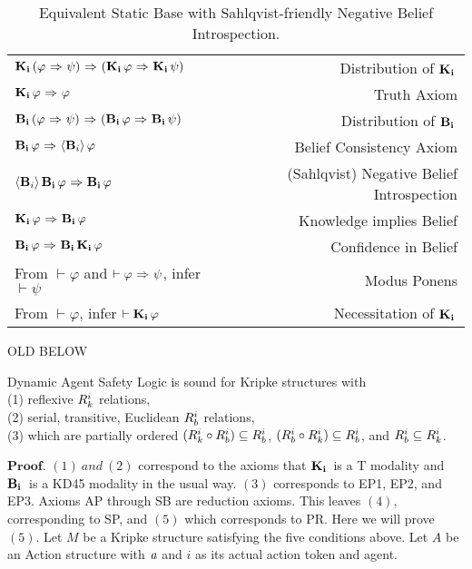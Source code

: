 \begin{table}[H]
	\begin{center}
		\begin{tabular}{| l r |}
			\hline
			$\mathbf{K}_{\mathbf{i}}\,(\varphi {\ \Rightarrow \ } \psi) {\ \Rightarrow \ } (\mathbf{K}_{\mathbf{i}}\,\varphi {\ \Rightarrow \ } \mathbf{K}_{\mathbf{i}}\,\psi)$ & Distribution of $\mathbf{K}_{\mathbf{i}}\,$ \\
			$\mathbf{K}_{\mathbf{i}}\,\varphi {\ \Rightarrow \ } \varphi$ & Truth Axiom \\
			$\mathbf{B}_{\mathbf{i}}\,(\varphi {\ \Rightarrow \ } \psi) {\ \Rightarrow \ } (\mathbf{B}_{\mathbf{i}}\,\varphi {\ \Rightarrow \ } \mathbf{B}_{\mathbf{i}}\,\psi)$ & Distribution of $\mathbf{B}_{\mathbf{i}}\,$\\
			$\mathbf{B}_{\mathbf{i}}\,\varphi {\ \Rightarrow \ } \langle \mathbf{B}_{i} \rangle\,\varphi$ & Belief Consistency Axiom\\
			$\langle \mathbf{B}_{i} \rangle\,\mathbf{B}_{\mathbf{i}}\,\varphi {\ \Rightarrow \ } \mathbf{B}_{\mathbf{i}}\,\varphi$ & (Sahlqvist) Negative Belief Introspection\\
			$\mathbf{K}_{\mathbf{i}}\,\varphi {\ \Rightarrow \ } \mathbf{B}_{\mathbf{i}}\,\varphi$ & Knowledge implies Belief \\
			$\mathbf{B}_{\mathbf{i}}\,\varphi {\ \Rightarrow \ } \mathbf{B}_{\mathbf{i}}\,\mathbf{K}_{\mathbf{i}}\,\varphi$ & Confidence in Belief\\
			From $\vdash \varphi$ and $\vdash \varphi {\ \Rightarrow \ } \psi$, infer $\vdash\psi$ & Modus Ponens\\
			From $\vdash \varphi$, infer $\vdash \mathbf{K}_{\mathbf{i}}\,\varphi$ & Necessitation of $\mathbf{K}_{\mathbf{i}}\,$\\
			\hline
		\end{tabular}
		\caption{Equivalent Static Base with Sahlqvist-friendly Negative Belief Introspection.}
	\end{center}
\end{table}




OLD BELOW

\begin{tcolorbox}
	\begin{theorem}[Soundness]
		Dynamic Agent Safety Logic is sound for Kripke structures with\\ (1) reflexive $R_{k}^i$ relations,\\ (2) serial, transitive, Euclidean $R_{b}^i$ relations, \\(3) which are partially ordered $(R_{k}^i \circ R_{b}^i) \subseteq R_{b}^i$, $(R_{b}^i \circ R_{k}^i) \subseteq R_{b}^i$, and $R_{b}^i \subseteq R_{k}^i$.
	\end{theorem}
\end{tcolorbox}
$\mathbf{Proof}.$ $(1)\  and\  (2)$ correspond to the axioms that $\mathbf{K}_{\mathbf{i}}\,$ is a T modality and $\mathbf{B}_{\mathbf{i}}\,$ is a KD45 modality in the usual way. $(3)$ corresponds to EP1, EP2, and EP3. Axioms AP through SB are reduction axioms. This leaves $(4)$, corresponding to SP, and $(5)$ which corresponds to PR. Here we will prove $(5)$. Let $M$ be a Kripke structure satisfying the five conditions above. Let $A$ be an Action structure with $\mathit{a}$ and $i$ as its actual action token and agent. 

